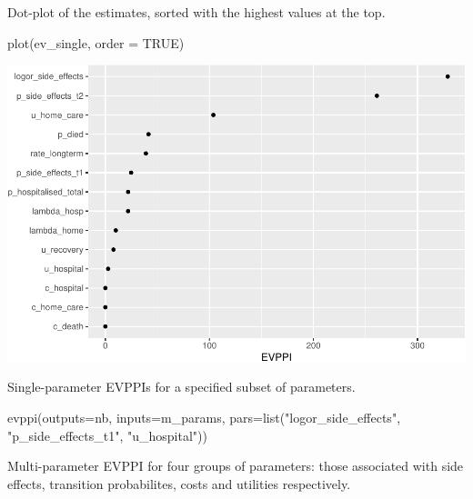 \documentclass[
]{article}
\newenvironment{Shaded}{\begin{snugshade}}{\end{snugshade}}
\newcommand{\AttributeTok}[1]{\textcolor[rgb]{0.77,0.63,0.00}{#1}}
\newcommand{\ConstantTok}[1]{\textcolor[rgb]{0.00,0.00,0.00}{#1}}
\newcommand{\FunctionTok}[1]{\textcolor[rgb]{0.00,0.00,0.00}{#1}}
\newcommand{\NormalTok}[1]{#1}
\newcommand{\StringTok}[1]{\textcolor[rgb]{0.31,0.60,0.02}{#1}}
\begin{document}
Dot-plot of the estimates, sorted with the highest values at the top.

\begin{Shaded}
\begin{Highlighting}[]
\FunctionTok{plot}\NormalTok{(ev\_single, }\AttributeTok{order =} \ConstantTok{TRUE}\NormalTok{)}
\end{Highlighting}
\end{Shaded}

\includegraphics{evppi_reg_files/figure-latex/dotplot-1.pdf}

Single-parameter EVPPIs for a specified subset of parameters.

\begin{Shaded}
\begin{Highlighting}[]
\FunctionTok{evppi}\NormalTok{(}\AttributeTok{outputs=}\NormalTok{nb, }\AttributeTok{inputs=}\NormalTok{m\_params, }
      \AttributeTok{pars=}\FunctionTok{list}\NormalTok{(}\StringTok{"logor\_side\_effects"}\NormalTok{, }\StringTok{"p\_side\_effects\_t1"}\NormalTok{, }\StringTok{"u\_hospital"}\NormalTok{))}
\end{Highlighting}
\end{Shaded}

Multi-parameter EVPPI for four groups of parameters: those associated
with side effects, transition probabilites, costs and utilities
respectively.
\end{document}
